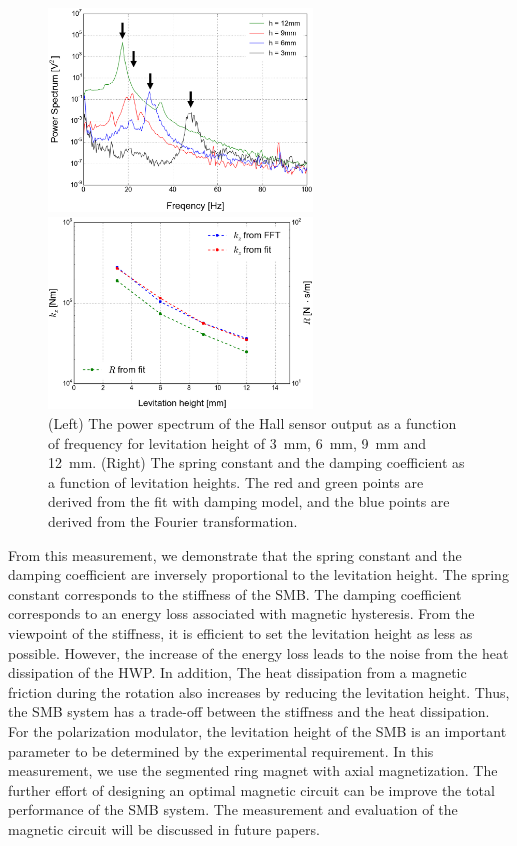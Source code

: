 \documentclass[a4paper]{jpconf}
\begin{document}
\begin{figure}[htbp]
  \centering
  \begin{minipage}{0.45\hsize}
    \includegraphics[width=70mm]{vibration_fft_B.eps}
  \end{minipage}
  \begin{minipage}{0.45\hsize}
    \centering
    \includegraphics[width=70mm]{SpringConstant.eps}
  \end{minipage}
  \caption{(Left) The power spectrum of the Hall sensor output as a function of frequency for levitation height of 3~mm, 6~mm, 9~mm and 12~mm.
    (Right) The spring constant and the damping coefficient as a function of levitation heights.
    The red and green points are derived from the fit with damping model, and the blue points are derived from the Fourier transformation.}
  \label{fig:fft}
\end{figure}

From this measurement, we demonstrate that the spring constant and the damping coefficient are inversely proportional to the levitation height.
The spring constant corresponds to the stiffness of the SMB.
The damping coefficient corresponds to an energy loss associated with magnetic hysteresis.
From the viewpoint of the stiffness, it is efficient to set the levitation height as less as possible.
However, the increase of the energy loss leads to the noise from the heat dissipation of the HWP.
In addition, The heat dissipation from a magnetic friction during the rotation also increases by reducing the levitation height.
Thus, the SMB system has a trade-off between the stiffness and the heat dissipation.
For the polarization modulator, the levitation height of the SMB is an important parameter to be determined by the experimental requirement.
In this measurement, we use the segmented ring magnet with axial magnetization.
The further effort of designing an optimal magnetic circuit can be improve the total performance of the SMB system.
The measurement and evaluation of the magnetic circuit will be discussed in future papers.
\end{document}
